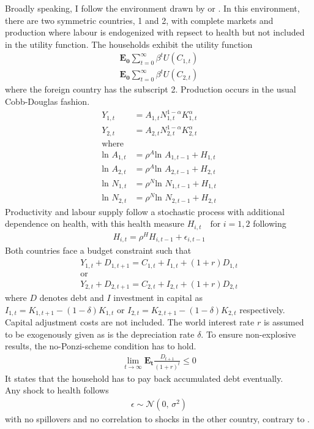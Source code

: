 \documentclass{article}
\begin{document}
Broadly speaking, I follow the environment drawn by \cite{backus1992international} or \cite{kim2003spurious}. In this environment, there are two symmetric countries, 1 and 2, with complete markets and production where labour is endogenized with repsect to health but not included in the utility function. The households exhibit the utility function
\begin{align}
\mathbf{E_0} \sum_{t=0}^{\infty} \beta^{t} U(C_{1, t}) \\
\mathbf{E_0} \sum_{t=0}^{\infty} \beta^{t} U(C_{2, t})
\end{align} 
where the foreign country has the subscript 2. Production occurs in the usual Cobb-Douglas fashion.
\begin{align}
Y_{1, t} &= A_{1, t} N_{1, t}^{1-\alpha} K_{1, t}^{\alpha} \\
Y_{2, t} &= A_{2, t} N_{2, t}^{1-\alpha} K_{2, t}^{\alpha} \\
\text{where} \nonumber \\
\text{ln } A_{1, t} &= \rho^A \text{ln } A_{1, t-1} + H_{1, t} \\
\text{ln } A_{2, t} &= \rho^A \text{ln } A_{2, t-1} + H_{2, t} \\
\text{ln } N_{1, t} &= \rho^N \text{ln } N_{1, t-1} + H_{1, t} \\
\text{ln } N_{2, t} &= \rho^N \text{ln } N_{2, t-1} + H_{2, t}
\end{align}
Productivity and labour supply follow a stochastic process with additional dependence on health, with this health measure $H_{i, t} \text{  } \text{ for }  i= 1,2$ following 
\begin{align}
H_{i,t} = \rho^H H_{i, t-1} + \epsilon_{i, t-1}
\end{align}
Both countries face a budget constraint such that 
\begin{align}
Y_{1, t} + D_{1, t+1} = C_{1, t} + I_{1, t} + (1+r)D_{1, t} \\
\text{or} \nonumber \\
Y_{2, t} + D_{2, t+1} = C_{2, t} + I_{2, t} + (1+r)D_{2, t}
\end{align}
where $D$ denotes debt and $I$ investment in capital as $I_{1, t} = K_{1, t+1} - (1 - \delta)K_{1, t}$ or $I_{2, t} = K_{2, t+1} - (1 - \delta)K_{2, t}$ respectively. Capital adjustment costs are not included. The world interest rate $r$ is assumed to be exogenously given as is the depreciation rate $\delta$. To ensure non-explosive results, the no-Ponzi-scheme condition has to hold.
\begin{align}
\lim_{t \to \infty} \mathbf{E_t} \frac{D_{t+1}}{(1+r)^t} \leq 0
\end{align}
It states that the household has to pay back accumulated debt eventually. \\
Any shock to health follows 
\begin{align}
\epsilon \sim \mathcal{N}(0,\,\sigma^{2})
\end{align} 
with no spillovers and no correlation to shocks in the other country, contrary to \cite{backus1992international}.
\end{document}
